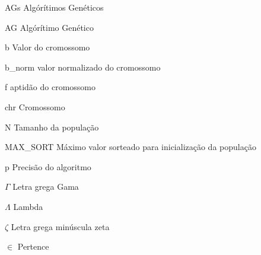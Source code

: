 \documentclass[
    12pt,               %
    twoside,            %
    a4paper,            %
    english,            %
    french,             %
    spanish,            %
    brazil,             %
    ]{abntex2}
\begin{document}
\frenchspacing 


\imprimircapa

\imprimirfolhaderosto


\listoffigures*
\cleardoublepage

\listoftables*
\cleardoublepage

\begin{siglas}
  \item[AGs] Algórítimos Genéticos
  \item[AG] Algórítimo Genético
  \item[b] Valor do cromossomo
  \item[b\_norm] valor normalizado do cromossomo
  \item[f] aptidão do cromossomo  
  \item[chr] Cromossomo
  \item[N] Tamanho da população
  \item[MAX\_SORT] Máximo valor sorteado para inicialização da população 
  \item[p] Precisão do algoritmo 

\end{siglas}

\begin{simbolos}
  \item[$ \Gamma $] Letra grega Gama
  \item[$ \Lambda $] Lambda
  \item[$ \zeta $] Letra grega minúscula zeta
  \item[$ \in $] Pertence
\end{simbolos}

\tableofcontents*
\cleardoublepage
\end{document}

